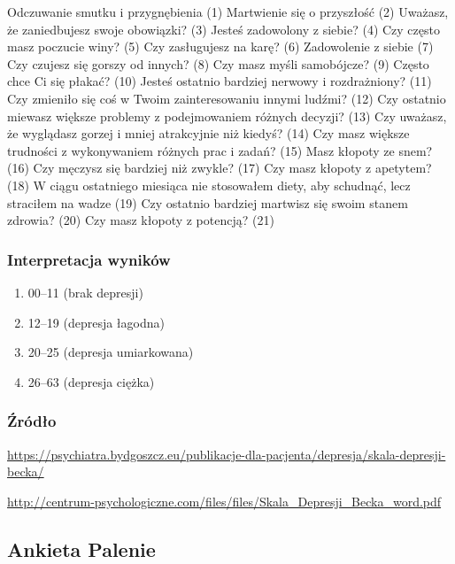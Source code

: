 \documentclass[
  openany]{book}
\providecommand{\tightlist}{%
  \setlength{\itemsep}{0pt}\setlength{\parskip}{0pt}}
\begin{document}
Odczuwanie smutku i przygnębienia (1)
Martwienie się o przyszłość (2)
Uważasz, że zaniedbujesz swoje obowiązki? (3)
Jesteś zadowolony z siebie? (4)
Czy często masz poczucie winy? (5)
Czy zasługujesz na karę? (6)
Zadowolenie z siebie (7)
Czy czujesz się gorszy od innych? (8)
Czy masz myśli samobójcze? (9)
Często chce Ci się płakać? (10)
Jesteś ostatnio bardziej nerwowy i rozdrażniony? (11)
Czy zmieniło się coś w Twoim zainteresowaniu innymi ludźmi? (12)
Czy ostatnio miewasz większe problemy z podejmowaniem różnych decyzji? (13)
Czy uważasz, że wyglądasz gorzej i mniej atrakcyjnie niż kiedyś? (14)
Czy masz większe trudności z wykonywaniem różnych prac i zadań? (15)
Masz kłopoty ze snem? (16)
Czy męczysz się bardziej niż zwykle? (17)
Czy masz kłopoty z apetytem? (18)
W ciągu ostatniego miesiąca nie stosowałem diety, aby schudnąć,
lecz straciłem na wadze (19)
Czy ostatnio bardziej martwisz się swoim stanem zdrowia? (20)
Czy masz kłopoty z potencją? (21)

\hypertarget{interpretacja-wynikuxf3w}{%
\subsubsection{Interpretacja wyników}\label{interpretacja-wynikuxf3w}}

\begin{enumerate}
\def\labelenumi{\arabic{enumi}.}
\tightlist
\item
  00--11 (brak depresji)
\item
  12--19 (depresja łagodna)
\item
  20--25 (depresja umiarkowana)
\item
  26--63 (depresja ciężka)
\end{enumerate}

\hypertarget{ux17aruxf3dux142o}{%
\subsubsection{Źródło}\label{ux17aruxf3dux142o}}

\url{https://psychiatra.bydgoszcz.eu/publikacje-dla-pacjenta/depresja/skala-depresji-becka/}

\url{http://centrum-psychologiczne.com/files/files/Skala_Depresji_Becka_word.pdf}

\hypertarget{ankieta-palenie}{%
\subsection{Ankieta Palenie}\label{ankieta-palenie}}
\end{document}
